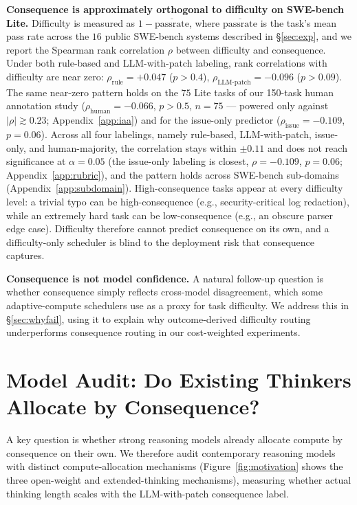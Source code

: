 \documentclass{article}
\begin{document}
\textbf{Consequence is approximately orthogonal to difficulty on
SWE-bench Lite.} Difficulty is measured as $1-\overline{\mathrm{passrate}}$, where
$\overline{\mathrm{passrate}}$ is the task's mean pass rate across the
$16$ public SWE-bench systems described in \S\ref{sec:exp}, and we report the Spearman rank correlation
$\rho$ between difficulty and consequence. Under both rule-based and LLM-with-patch labeling, rank correlations with difficulty are near zero: $\rho_{\mathrm{rule}}{=}{+}0.047$ ($p>0.4$), $\rho_{\mathrm{LLM\text{-}patch}}{=}{-}0.096$ ($p>0.09$). The same near-zero pattern holds on the $75$ Lite tasks of our
150-task human annotation study ($\rho_{\mathrm{human}}{=}{-}0.066$,
$p>0.5$, $n{=}75$ --- powered only against $|\rho| \gtrsim 0.23$;
Appendix~\ref{app:iaa}) and for the issue-only predictor
($\rho_{\mathrm{issue}}{=}{-}0.109$, $p=0.06$). Across all four labelings, namely
rule-based, LLM-with-patch, issue-only, and human-majority, the correlation stays within $\pm 0.11$ and does not reach
significance at $\alpha = 0.05$ (the issue-only labeling is closest,
$\rho = -0.109$, $p = 0.06$; Appendix~\ref{app:rubric}), and the pattern holds across SWE-bench sub-domains (Appendix~\ref{app:subdomain}). High-consequence tasks appear at every difficulty level: a trivial typo can be high-consequence (e.g., security-critical log redaction), while an extremely hard task can be low-consequence (e.g., an obscure parser edge case). Difficulty therefore cannot predict consequence on its own, and a difficulty-only scheduler is blind to the deployment risk that consequence captures.

\textbf{Consequence is not model confidence.} A natural follow-up question is whether consequence simply reflects cross-model disagreement, which some adaptive-compute schedulers use as a proxy for task difficulty. We address this in \S\ref{sec:whyfail}, using it to explain why outcome-derived difficulty routing underperforms consequence routing in our cost-weighted experiments.

\section{Model Audit: Do Existing Thinkers Allocate by Consequence?}
\label{sec:audit}

A key question is whether strong reasoning models already allocate
compute by consequence on their own. We therefore audit contemporary
reasoning models with distinct compute-allocation mechanisms
(Figure~\ref{fig:motivation} shows the three open-weight and
extended-thinking mechanisms), measuring whether actual thinking
length scales with the LLM-with-patch consequence label.
\end{document}

